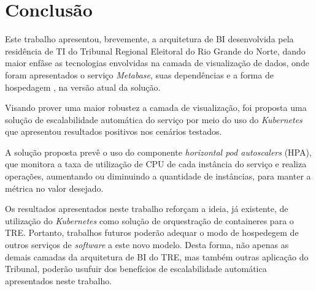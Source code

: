 \section{Conclusão}

Este trabalho apresentou, brevemente, a arquitetura de BI desenvolvida pela residência de TI do Tribunal Regional Eleitoral do Rio Grande do Norte, dando maior enfâse as tecnologias envolvidas na camada de visualização de dados, onde foram apresentados o serviço \textit{Metabase}, suas dependências e a forma de hospedagem , na versão atual da solução.

Visando prover uma maior robustez a camada de visualização, foi proposta uma solução de escalabilidade automática do serviço por meio do uso do \textit{Kubernetes} que apresentou resultados positivos nos cenários testados. 

A solução proposta prevê o uso do componente \textit{horizontal pod autoscalers} (HPA), que monitora a taxa de utilização de CPU de cada instância do serviço e realiza operações, aumentando ou diminuindo a quantidade de instâncias, para manter a métrica no valor desejado.

Os resultados apresentados neste trabalho reforçam a ideia, já existente, de utilização do \textit{Kubernetes} como solução de orquestração de containeres para o TRE. Portanto, trabalhos futuros poderão adequar o modo de hospedegem de outros serviços de \textit{software} a este novo modelo. Desta forma, não apenas as demais camadas da arquitetura de BI do TRE, mas também outras aplicação do Tribunal, poderão usufuir dos benefícios de escalabilidade automática apresentados neste trabalho. 
